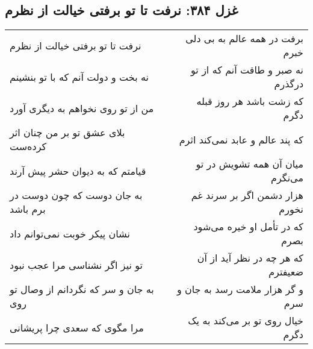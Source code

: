 \begin{center}
\section*{غزل ۳۸۴: نرفت تا تو برفتی خیالت از نظرم}
\label{sec:384}
\begin{longtable}{l p{0.5cm} r}
نرفت تا تو برفتی خیالت از نظرم
&&
برفت در همه عالم به بی دلی خبرم
\\
نه بخت و دولت آنم که با تو بنشینم
&&
نه صبر و طاقت آنم که از تو درگذرم
\\
من از تو روی نخواهم به دیگری آورد
&&
که زشت باشد هر روز قبله دگرم
\\
بلای عشق تو بر من چنان اثر کرده‌ست
&&
که پند عالم و عابد نمی‌کند اثرم
\\
قیامتم که به دیوان حشر پیش آرند
&&
میان آن همه تشویش در تو می‌نگرم
\\
به جان دوست که چون دوست در برم باشد
&&
هزار دشمن اگر بر سرند غم نخورم
\\
نشان پیکر خوبت نمی‌توانم داد
&&
که در تأمل او خیره می‌شود بصرم
\\
تو نیز اگر نشناسی مرا عجب نبود
&&
که هر چه در نظر آید از آن ضعیفترم
\\
به جان و سر که نگردانم از وصال تو روی
&&
و گر هزار ملامت رسد به جان و سرم
\\
مرا مگوی که سعدی چرا پریشانی
&&
خیال روی تو بر می‌کند به یک دگرم
\\
\end{longtable}
\end{center}
